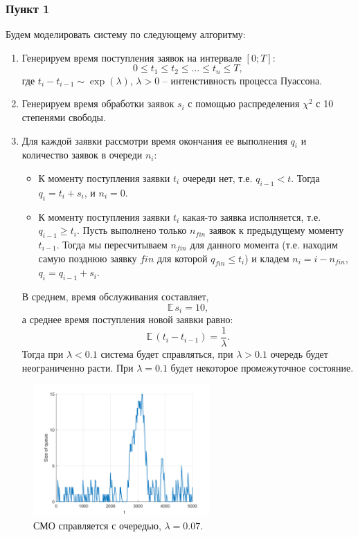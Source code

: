 \documentclass[oneside, final, 12pt]{article}
\def\E{{\mathbb{E} }\,}
\begin{document}
\subsubsection{Пункт 1}
	Будем моделировать систему по следующему алгоритму:
	\begin{enumerate}
		\item Генерируем время поступления заявок на интервале $[0;T]$:
			$$ 0 \leqslant t_1\leqslant t_2 \leqslant \ldots \leqslant t_n \leqslant T, $$
			где $t_i - t_{i-1} \sim \exp(\lambda)$, $\lambda > 0$ -- интенстивность процесса Пуассона. 
		\item Генерируем время обработки заявок $s_i$ с помощью распределения $\chi^2$ с 10 степенями 
				свободы. 
		\item Для каждой заявки рассмотри время окончания ее выполнения $q_i$ 
			и количество заявок в очереди $n_i$:
				\begin{itemize}
					\item К моменту поступления заявки $t_i$ очереди нет, т.е. $q_{i-1}<t$. Тогда $q_i = t_i + s_i$, 
						и $n_i = 0$.
					\item К моменту поступления заявки $t_i$ какая-то заявка исполняется, 
						т.е. $q_{i-1}\geqslant t_i$. Пусть выполнено только $n_{fin}$ заявок к предыдущему 
						моменту $t_{i-1}$.
						Тогда мы пересчитываем $n_{fin}$ для данного момента (т.е. находим
						самую позднюю заявку $fin$ для которой $q_{fin} \leqslant t_i$)
						и кладем $n_i = i - n_{fin}$, $q_i = q_{i-1}+ s_i$.
				\end{itemize}
				В среднем, время обслуживания составляет, $$\E  s_i = 10, $$
				а среднее время поступления новой заявки равно: $$\E  (t_i - t_{i-1}) =\frac{1}{\lambda}.$$
				Тогда при $\lambda < 0.1$ система будет справляться, при $\lambda > 0.1$ очередь будет 
				неограниченно расти. При $\lambda = 0.1$ будет некоторое промежуточное состояние.
	\end{enumerate}
	\begin{figure}[h!]
		\centering
		\includegraphics[width=0.6\textwidth]{../code/Task_11/pict/hom_7_ex.png}
		\caption{СМО справляется с очередью, $\lambda =  0.07$.}
    \end{figure}
\end{document}
